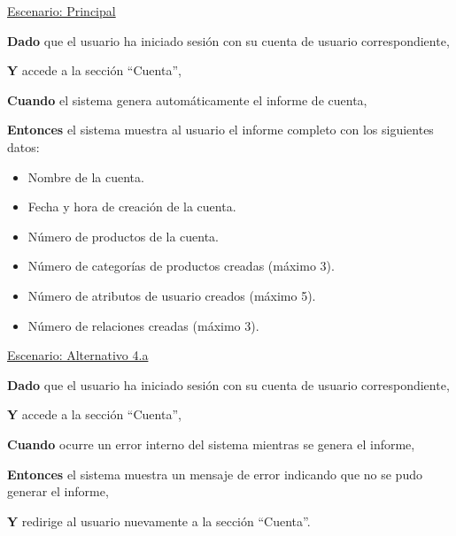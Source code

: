 \underline{Escenario: Principal}\par
\vspace{0.15cm} 
\textbf{Dado} que el usuario ha iniciado sesión con su cuenta de usuario correspondiente,\par 
\textbf{Y} accede a la sección \enquote{Cuenta},\par 
\textbf{Cuando} el sistema genera automáticamente el informe de cuenta,\par 
\textbf{Entonces} el sistema muestra al usuario el informe completo con los siguientes datos:\par 
\begin{itemize} 
    \item Nombre de la cuenta. 
    \item Fecha y hora de creación de la cuenta. 
    \item Número de productos de la cuenta. 
    \item Número de categorías de productos creadas (máximo 3). 
    \item Número de atributos de usuario creados (máximo 5). 
    \item Número de relaciones creadas (máximo 3). 
\end{itemize} 
\vspace{0.20cm}


\underline{Escenario: Alternativo 4.a}\par
\vspace{0.15cm} 
\textbf{Dado} que el usuario ha iniciado sesión con su cuenta de usuario correspondiente,\par 
\textbf{Y} accede a la sección \enquote{Cuenta},\par 
\textbf{Cuando} ocurre un error interno del sistema mientras se genera el informe,\par 
\textbf{Entonces} el sistema muestra un mensaje de error indicando que no se pudo generar el informe,\par 
\textbf{Y} redirige al usuario nuevamente a la sección \enquote{Cuenta}.\par 
\vspace{0.20cm}



